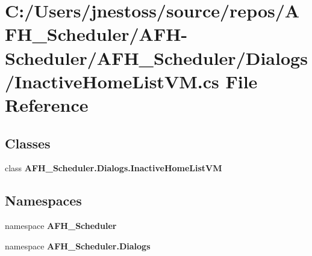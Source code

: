\section{C\+:/\+Users/jnestoss/source/repos/\+A\+F\+H\+\_\+\+Scheduler/\+A\+F\+H-\/\+Scheduler/\+A\+F\+H\+\_\+\+Scheduler/\+Dialogs/\+Inactive\+Home\+List\+VM.cs File Reference}
\label{_inactive_home_list_v_m_8cs}
\subsection*{Classes}
\begin{DoxyCompactItemize}
\item 
class \textbf{ A\+F\+H\+\_\+\+Scheduler.\+Dialogs.\+Inactive\+Home\+List\+VM}
\end{DoxyCompactItemize}
\subsection*{Namespaces}
\begin{DoxyCompactItemize}
\item 
namespace \textbf{ A\+F\+H\+\_\+\+Scheduler}
\item 
namespace \textbf{ A\+F\+H\+\_\+\+Scheduler.\+Dialogs}
\end{DoxyCompactItemize}
